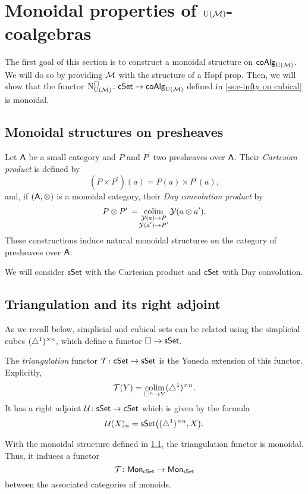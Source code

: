 
\section{Monoidal properties of \texorpdfstring{${\operatorname{U}(\mathcal{M})}$}{UM}-coalgebras} \label{s:monoidal}

The first goal of this section is to construct a monoidal structure on $\mathsf{coAlg}_{\operatorname{U}(\mathcal{M})}$.
We will do so by providing $\mathcal{M}$ with the structure of a Hopf prop.
Then, we will show that the functor $\operatorname{N^{\square}_{{\operatorname{U}(\mathcal{M})}}} \colon \mathsf{cSet} \to \mathsf{coAlg}_{{\operatorname{U}(\mathcal{M})}}$ defined in \cref{ss:e-infty on cubical} is monoidal.

\subsection{Monoidal structures on presheaves} \label{ss:day convolution}

Let $\mathsf{A}$ be a small category and $P$ and $P^\prime$ two presheaves over $\mathsf{A}$.
Their \textit{Cartesian product} is defined by
\[
(P \times P^\prime)(a) = P(a) \times P^\prime(a),
\]
and, if $(\mathsf{A}, \otimes)$ is a monoidal category, their \textit{Day convolution product} by
\[
P \otimes P^\prime \, = \! \operatorname*{colim}_{\substack{\operatorname{\mathcal{Y}}(a) \to P \\ \operatorname{\mathcal{Y}}(a^\prime) \to P^\prime}} \operatorname{\mathcal{Y}}(a \otimes a^\prime).
\]
These constructions induce natural monoidal structures on the category of presheaves over $\mathsf{A}$.

We will consider $\mathsf{sSet}$ with the Cartesian product and $\mathsf{cSet}$ with Day convolution.


\subsection{Triangulation and its right adjoint} \label{ss:triangulation and its adjoint}

As we recall below, simplicial and cubical sets can be related using the simplicial cubes $(\triangle^1)^{\times n}$, which define a functor $\square \to \mathsf{sSet}$.

The \textit{triangulation} functor $\operatorname{\mathcal{T}} \colon \mathsf{cSet} \to \mathsf{sSet}$ is the Yoneda extension of this functor.
Explicitly,
\[
\operatorname{\mathcal{T}}(Y) = \operatorname*{colim}_{\square^n \to Y} (\triangle^1)^{\times n}.
\]
It has a right adjoint $\mathcal{U} \colon \mathsf{sSet} \to \mathsf{cSet}$ which is given by the formula
\[
\mathcal{U}(X)_n = \mathsf{sSet} \big( (\triangle^1)^{\times n}, X \big).
\]

With the monoidal structure defined in \cref{ss:day convolution}, the triangulation functor is monoidal.
Thus, it induces a functor
\[
\operatorname{\mathcal{T}} \colon \mathsf{Mon}_{\mathsf{cSet}} \to \mathsf{Mon}_{\mathsf{sSet}}
\]
between the associated categories of monoids.

